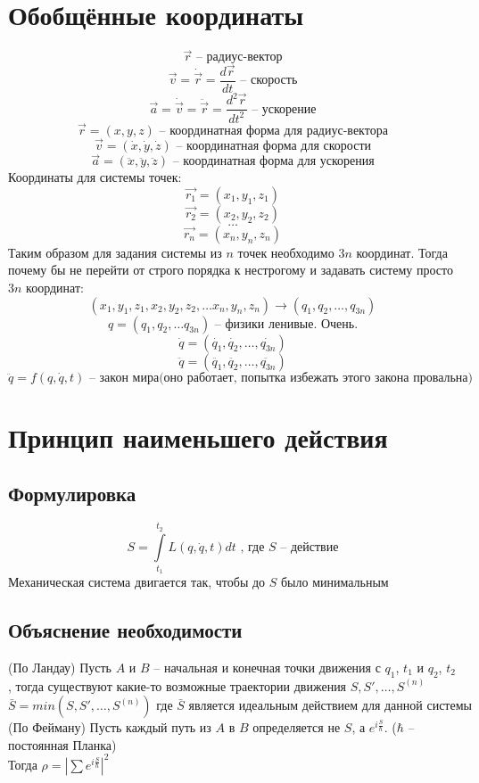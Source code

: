 \documentclass[a4paper, 12pt, titlepage, fleqn]{article}
\newcommand{\T}{\textbf}
\begin{document}
	\begin{titlepage}
	\end{titlepage}
	\section{Обобщённые координаты} 
		\[
			\vec{r} \textbf{ -- радиус-вектор}
		\] 
		\[
			\vec{v} = \dot{\vec{r}} = \frac{d \vec{r}}{dt} \T{ -- скорость}
		\]
		\[
			\vec{a} = \dot{\vec{v}} = \ddot{\vec{r}} = \frac{d^2 \vec{r}}{dt^2} \T{ -- ускорение}
		\]
		\[
			\vec{r} = (x, y, z)  \T{ -- координатная форма для радиус-вектора}
		\]
		\[
			\vec{v} = (\dot{x}, \dot{y}, \dot{z}) \T{ -- координатная форма для скорости}
		\]
		\[
			\vec{a} = (\ddot{x}, \ddot{y}, \ddot{z}) \T{ -- координатная форма для ускорения}
		\]
		Координаты для системы точек:
		\[
			\vec{r_1} = (x_1, y_1, z_1) 
		\]
		\[
			\vec{r_2} = (x_2, y_2, z_2)
		\]
		\[
			\dots
		\]
		\[
			\vec{r_n} = (x_n, y_n, z_n)
		\]
		Таким образом для задания системы из $n$ точек необходимо $3n$ координат. Тогда почему бы не перейти от строго порядка к нестрогому и задавать систему просто $3n$ координат:
		\[
			(x_1, y_1, z_1, x_2, y_2, z_2, \dots x_n, y_n, z_n) \to (q_1, q_2, \dots, q_{3n})
		\]
		\[
			q = (q_1, q_2, \dots q_{3n}) \T{ -- физики ленивые. Очень.}
		\] 
		\[
			\dot{q} = (\dot{q_1}, \dot{q_2}, \dots, \dot{q_{3n}})
		\]
		\[
			\ddot{q} = (\ddot{q_1}, \ddot{q_2}, \dots, \ddot{q_{3n}})
		\]
		\[
			\ddot{q} = f(q, \dot{q}, t) \T{ -- закон мира(оно работает, попытка избежать этого закона провальна)}
		\]
	\section{Принцип наименьшего действия}
		\subsection{Формулировка}
			\[
				S = \int\limits_{t_1}^{t_2} L(q, \dot{q}, t)dt \T{ , где } S \T{ -- действие}
			\]
			Механическая система двигается так, чтобы до $S$ было минимальным
		\subsection{Объяснение необходимости}
			(По Ландау) Пусть $A$ и $B$ -- начальная и конечная точки движения с $q_1$, $t_1$ и $q_2$, $t_2$, тогда существуют какие-то возможные траектории движения $S, S', \dots, S^{(n)}$
			\[
				\bar{S} = min(S, S', \dots, S^{(n)}) \T{ где } \bar{S} \T{ является идеальным действием для данной системы}
			\]
			(По Фейману) Пусть каждый путь из $A$ в $B$ определяется не $S$, а $e^{i\frac{S}{\hbar}}$. ($\hbar$ -- постоянная Планка)\\
			Тогда $\rho = |\sum e^{i\frac{S}{\hbar}}|^2$\\
			
\end{document}
